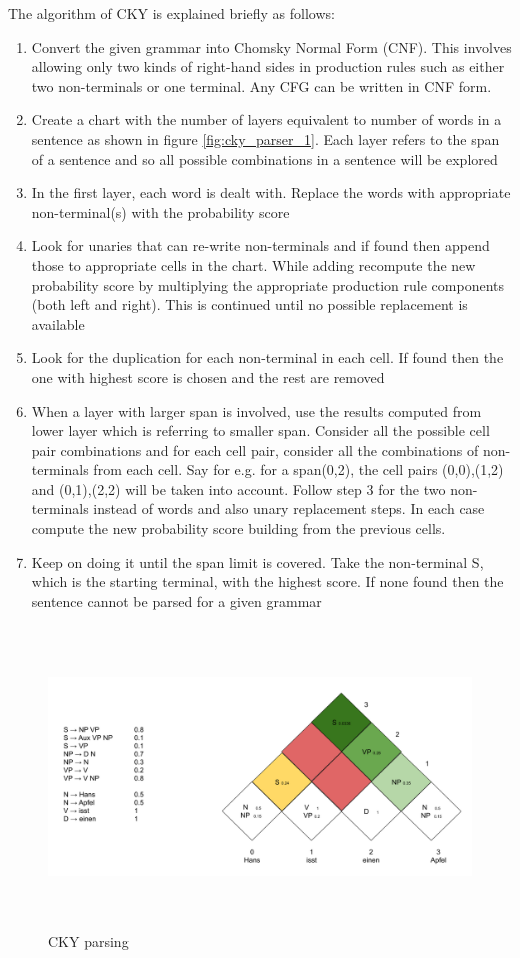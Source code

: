 \documentclass[a4paper, 11pt]{article}
\begin{document}
The algorithm of CKY is explained briefly as follows: 
\begin{enumerate}
\item Convert the given grammar into  Chomsky Normal Form (CNF). This involves allowing only two kinds of right-hand sides in production rules such as either two non-terminals or one terminal. Any CFG can be written in CNF form.
\item Create a chart with the number of layers equivalent to number of words in a sentence as shown in figure \ref{fig:cky_parser_1}. Each layer refers to the span of a sentence and so all possible combinations in a sentence will be explored
\item In the first layer, each word is dealt with. Replace the words with appropriate non-terminal(s) with the probability score
\item Look for unaries that can re-write non-terminals and if found then append those to appropriate cells in the chart. While adding recompute the new probability score by multiplying the appropriate production rule components (both left and right). This is continued until no possible replacement is available 
\item Look for the duplication for each non-terminal in each cell. If found then the one with highest score is chosen and the rest are removed
\item When a layer with larger span is involved, use the results computed from lower layer which is referring to smaller span. Consider all the possible cell pair combinations and for each cell pair, consider all the combinations of non-terminals from each cell. Say for e.g. for a span(0,2), the cell pairs {(0,0),(1,2)} and {(0,1),(2,2)} will be taken into account. Follow step 3 for the two non-terminals instead of words and also unary replacement steps. In each case compute the new probability score building from the previous cells. 
\item Keep on doing it until the span limit is covered. Take the non-terminal S, which is the starting terminal, with the highest score. If none found then the sentence cannot be parsed for a given grammar
\end{enumerate}

\begin{figure}[H]
    \centering
    \includegraphics[width=\textwidth,height=8cm,keepaspectratio=true]
    {cky-parsing-chart-2.png}
    \caption{
        CKY parsing
    }
    \label{fig:cky_parser_2}
\end{figure}
\end{document}
